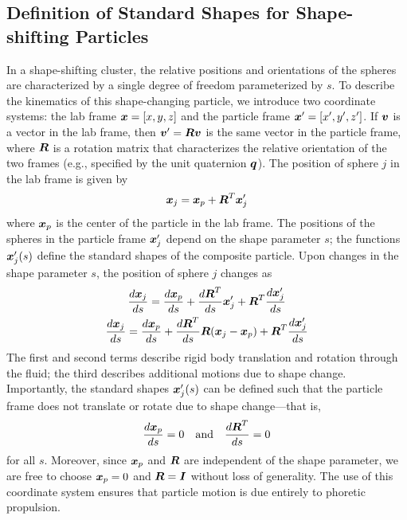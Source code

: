\begin{appendices}
\clearpage
\section{Definition of Standard Shapes for Shape-shifting Particles}

In a shape-shifting cluster, the relative positions and orientations of the spheres are characterized by a single degree of freedom parameterized by $s$. To describe the kinematics of this shape-changing particle, we introduce two coordinate systems: the lab frame $\boldsymbol{x}=[x,y,z]$ and the particle frame $\boldsymbol{x}'=[x',y',z']$.  If $\boldsymbol{v}$ is a vector in the lab frame, then $\boldsymbol{v}'=\boldsymbol{R}\boldsymbol{v}$ is the same vector in the particle frame, where $\boldsymbol{R}$ is a rotation matrix that characterizes the relative orientation of the two frames (e.g., specified by the unit quaternion $\boldsymbol{q}$).  The position of sphere $j$ in the lab frame is given by 
\begin{equation}
    \boldsymbol{x}_j = \boldsymbol{x}_p + \boldsymbol{R}^T\boldsymbol{x}'_j
\end{equation}
where $\boldsymbol{x}_p$ is the center of the particle in the lab frame.  The positions of the spheres in the particle frame $\boldsymbol{x}'_j$ depend on the shape parameter $s$; the functions $\boldsymbol{x}'_j(s)$ define the standard shapes of the composite particle.\autocite{Shapere1989} Upon changes in the shape parameter $s$, the position of sphere $j$ changes as 
\begin{gather}
    \frac{d\boldsymbol{x}_j}{d s} = \frac{d \boldsymbol{x}_p}{d s} + \frac{d\boldsymbol{R}^T}{d s}\boldsymbol{x}'_j + \boldsymbol{R}^T\frac{d \boldsymbol{x}'_j}{ds}
    \\
    \frac{d\boldsymbol{x}_j}{d s} = \frac{d \boldsymbol{x}_p}{d s} + \frac{d\boldsymbol{R}^T}{d s} \boldsymbol{R}(\boldsymbol{x}_j-\boldsymbol{x}_p) + \boldsymbol{R}^T\frac{d \boldsymbol{x}'_j}{ds}
\end{gather}
The first and second terms describe rigid body translation and rotation through the fluid; the third describes additional motions due to shape change. Importantly, the standard shapes $\boldsymbol{x}'_j(s)$ can be defined such that the particle frame does not translate or rotate due to shape change---that is,
\begin{equation}
    \frac{d \boldsymbol{x}_p}{d s} = 0 \quad \text{and} \quad \frac{d\boldsymbol{R}^T}{d s} = 0
\end{equation}
for all $s$.  Moreover, since $\boldsymbol{x}_p$ and $\boldsymbol{R}$ are independent of the shape parameter, we are free to choose $\boldsymbol{x}_p=0$ and $\boldsymbol{R}=\boldsymbol{I}$ without loss of generality.  The use of this coordinate system ensures that particle motion is due entirely to phoretic propulsion.


\end{appendices}
